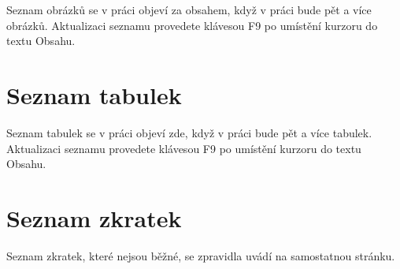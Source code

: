 
{\color{infoBlue}
Seznam obrázků se v práci objeví za obsahem, když v práci bude pět a více obrázků. Aktualizaci seznamu provedete klávesou F9 po umístění kurzoru do textu Obsahu.
}

{\setlength{\parskip}{0pt}
\makeatletter
{}
\makeatother
\par}

\chapter*{Seznam tabulek}

{\color{infoBlue}
Seznam tabulek se v práci objeví zde, když v práci bude pět a více tabulek. Aktualizaci seznamu provedete klávesou F9 po umístění kurzoru do textu Obsahu.
}

{\setlength{\parskip}{0pt}
\makeatletter
{}
\makeatother
\par}

\chapter*{Seznam zkratek}

{\color{infoBlue}
Seznam zkratek, které nejsou běžné, se zpravidla uvádí na samostatnou stránku.
}


\pagebreak
